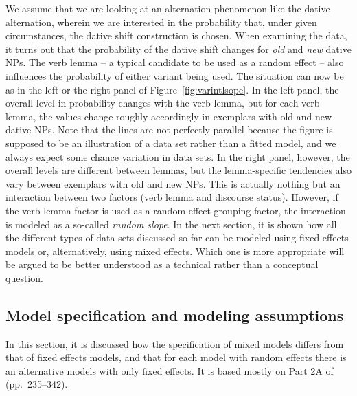 \documentclass[a4paper,12pt]{article}
\begin{document}
We assume that we are looking at an alternation phenomenon like the dative alternation, wherein we are interested in the probability that, under given circumstances, the dative shift construction is chosen.
When examining the data, it turns out that the probability of the dative shift changes for \textit{old} and \textit{new} dative NPs.
The verb lemma -- a typical candidate to be used as a random effect -- also influences the probability of either variant being used.
The situation can now be as in the left or the right panel of Figure~\ref{fig:varintlsope}.
In the left panel, the overall level in probability changes with the verb lemma, but for each verb lemma, the values change roughly accordingly in exemplars with old and new dative NPs.
Note that the lines are not perfectly parallel because the figure is supposed to be an illustration of a data set rather than a fitted model, and we always expect some chance variation in data sets.
In the right panel, however, the overall levels are different between lemmas, but the lemma-specific tendencies also vary between exemplars with old and new NPs.
This is actually nothing but an interaction between two factors (verb lemma and discourse status).
However, if the verb lemma factor is used as a random effect grouping factor, the interaction is modeled as a so-called \textit{random slope}.
In the next section, it is shown how all the different types of data sets discussed so far can be modeled using fixed effects models or, alternatively, using mixed effects.
Which one is more appropriate will be argued to be better understood as a technical rather than a conceptual question.


\subsection{Model specification and modeling assumptions}
\label{sec:modelspecificationandmodelingassumptions}

In this section, it is discussed how the specification of mixed models differs from that of fixed effects models, and that for each model with random effects there is an alternative models with only fixed effects.
It is based mostly on Part 2A of \citet{GelmanHill2006} (pp.~235--342).
\end{document}
